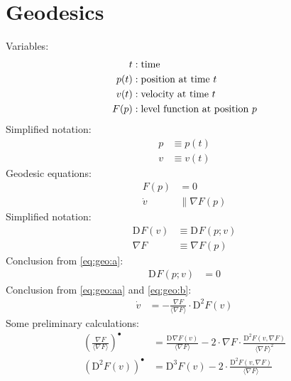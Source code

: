 \documentclass{scrartcl}
\newcommand{ \skaq }[ 1 ]{ \langle #1 \rangle }
\newcommand{ \para }{ \parallel }
\newcommand{ \mult }{ \cdot }
\newcommand{ \diff }[ 2 ]{ \mathrm{D}^{ #1 }#2 }
\newcommand{ \grad }[ 1 ]{ \nabla#1 }
\begin{document}
\newpage
\section{Geodesics}


Variables:
\begin{subequations}
\begin{align}
t  &:  \text{time}\\
p( t )  &:  \text{position at time $ t $}\\
v( t )  &:  \text{velocity at time $ t $}\\
F( p )  &:  \text{level function at position $ p $}
\end{align}
\end{subequations}
Simplified notation:
\begin{subequations}
\begin{align}
p  &\equiv  p( t )\\
v  &\equiv  v( t )
\end{align}
\end{subequations}
Geodesic equations:
\begin{subequations}
\label{eq:geo}
\begin{align}
F( p )  &=  0
\label{eq:geo:a}\\
\dot{ v }  &\para  \grad{ F }( p )
\label{eq:geo:b}
\end{align}
\end{subequations}
Simplified notation:
\begin{subequations}
\begin{align}
\diff{}{ F }( v )  &\equiv  \diff{}{ F }( p; v )\\
\grad{ F }         &\equiv  \grad{ F }( p )
\end{align}
\end{subequations}
Conclusion from \eqref{eq:geo:a}:
\begin{align}
\diff{}{ F }( p; v )  &=  0
\label{eq:geo:aa}
\end{align}
Conclusion from \eqref{eq:geo:aa} and \eqref{eq:geo:b}:
\begin{align}
\dot{ v }   &=  -\frac{ \grad{ F } }{ \skaq{ \grad{ F } } } \mult \diff{ 2 }{ F }( v )
\end{align}
Some preliminary calculations:
\begin{align}
\left( \frac{ \grad{ F } }{ \skaq{ \grad{ F } } } \right)^\bullet
&=   \frac{ \diff{}{ \grad{ F } }( v ) }{ \skaq{ \grad{ F } } }
            -  2 \mult \grad{ F } \mult \frac{ \diff{ 2 }{ F }( v, \grad{ F } ) }{ \skaq{ \grad{ F } }^2 }\\
\left( \diff{ 2 }{ F }( v ) \right)^\bullet  &=
\diff{ 3 }{ F }( v )  -  2 \mult \frac{ \diff{ 2 }{ F }( v, \grad{ F } ) }{ \skaq{ \grad{ F } } }
\end{align}
\end{document}
